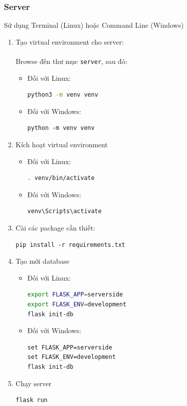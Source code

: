\documentclass[12pt]{article}
\begin{document}
\subsubsection{Server}
Sử dụng Terminal (Linux) hoặc Command Line (Windows)
\begin{enumerate}
\item Tạo virtual environment cho server:
\\\\
Browse đến thư mục \texttt{server}, sau đó:
\begin{itemize}
\item Đối với Linux:
\begin{lstlisting}[language=bash]
python3 -m venv venv
\end{lstlisting}
\item Đối với Windows:
\begin{lstlisting}
python -m venv venv
\end{lstlisting}
\end{itemize}

\item Kích hoạt virtual environment
\begin{itemize}
\item Đối với Linux:
\begin{lstlisting}[language=bash]
. venv/bin/activate
\end{lstlisting}

\item Đối với Windows:
\begin{lstlisting}
venv\Scripts\activate
\end{lstlisting}
\end{itemize}

\item Cài các package cần thiết:
\begin{lstlisting}
pip install -r requirements.txt
\end{lstlisting}

\item Tạo mới database
\begin{itemize}
\item Đối với Linux:
\begin{lstlisting}[language=bash]
export FLASK_APP=serverside
export FLASK_ENV=development
flask init-db
\end{lstlisting}

\item Đối với Windows:
\begin{lstlisting}
set FLASK_APP=serverside
set FLASK_ENV=development
flask init-db
\end{lstlisting}
\end{itemize}

\item Chạy server
\begin{lstlisting}
flask run
\end{lstlisting}

\end{enumerate}
\end{document}
